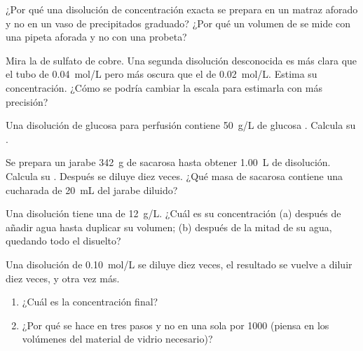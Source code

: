 \begin{exercise}[$\star\star$]\label{exo:g10:concentration-and-dilution:7}
¿Por qué una disolución de concentración exacta se prepara en un matraz
aforado y no en un vaso de precipitados graduado? ¿Por qué un volumen de
 se mide con una pipeta aforada y no con una probeta?
\end{exercise}

\begin{exercise}[$\star\star$]\label{exo:g10:concentration-and-dilution:8}
Mira la  de sulfato de cobre. Una segunda disolución
desconocida es más clara que el tubo de \qty{0.04}{mol/L} pero más
oscura que el de \qty{0.02}{mol/L}. Estima su concentración. ¿Cómo se
podría cambiar la escala para estimarla con más precisión?
\end{exercise}

\begin{exercise}[$\star\star$]\label{exo:g10:concentration-and-dilution:9}
Una disolución de glucosa para perfusión contiene \qty{50}{g/L} de
glucosa . Calcula su .
\end{exercise}

\begin{exercise}[$\star\star$]\label{exo:g10:concentration-and-dilution:10}
Se prepara un jarabe  \qty{342}{g} de sacarosa
 hasta obtener \qty{1.00}{L} de disolución. Calcula su
. Después se diluye diez veces. ¿Qué masa de
sacarosa contiene una cucharada de \qty{20}{mL} del jarabe diluido?
\end{exercise}

\begin{exercise}[$\star\star$]\label{exo:g10:concentration-and-dilution:11}
Una disolución tiene una  de \qty{12}{g/L}. ¿Cuál
es su concentración (a) después de añadir agua hasta duplicar su
volumen; (b) después de  la mitad de su agua, quedando todo el
 disuelto?
\end{exercise}

\begin{exercise}[$\star\star\star$]\label{exo:g10:concentration-and-dilution:12}
Una disolución de \qty{0.10}{mol/L} se diluye diez veces, el resultado
se vuelve a diluir diez veces, y otra vez más.
\begin{enumerate}
  \item ¿Cuál es la concentración final?
  \item ¿Por qué se hace en tres pasos y no en una sola  por 1000
        (piensa en los volúmenes del material de vidrio necesario)?
\end{enumerate}
\end{exercise}

